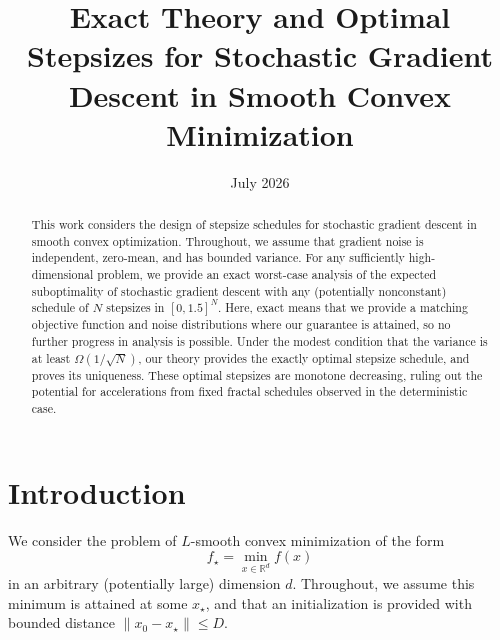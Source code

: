 \documentclass[11pt, hidelinks]{article}
\title{Exact Theory and Optimal Stepsizes for Stochastic Gradient Descent in Smooth Convex Minimization}
\author{}
\date{July 2026}
\begin{document}
\maketitle

\begin{abstract}
    This work considers the design of stepsize schedules for stochastic gradient descent in smooth convex optimization. Throughout, we assume that gradient noise is independent, zero-mean, and has bounded variance. For any sufficiently high-dimensional problem, we provide an exact worst-case analysis of the expected suboptimality of stochastic gradient descent with any (potentially nonconstant) schedule of $N$ stepsizes in $[0,1.5]^N$. Here, exact means that we provide a matching objective function and noise distributions where our guarantee is attained, so no further progress in analysis is possible. Under the modest condition that the variance is at least $\Omega(1/\sqrt{N})$, our theory provides the exactly optimal stepsize schedule, and proves its uniqueness. These optimal stepsizes are monotone decreasing, ruling out the potential for accelerations from fixed fractal schedules observed in the deterministic case.
\end{abstract}







\section{Introduction}

We consider the problem of $L$-smooth convex minimization of the form
\begin{equation}
    f_\star = \min_{x\in\mathbb{R}^d} f(x)
\end{equation}
in an arbitrary (potentially large) dimension $d$. Throughout, we assume this minimum is attained at some $x_\star$, and that an initialization is provided with bounded distance $\|x_0-x_\star\|\leq D$.
\end{document}
